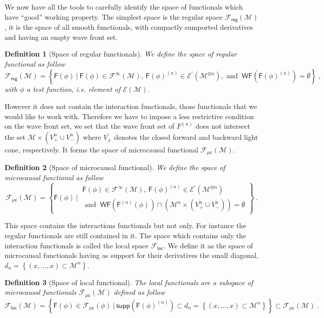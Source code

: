 \documentclass[10pt]{book}
\newcommand{\supp}{\mathsf{supp}}
\newcommand{\WF}{\mathsf{WF}}
\newcommand{\Ecal}{\mathcal{E}}
\newcommand{\Fcal}{\mathcal{F}}
\newcommand{\Mcal}{\mathcal{M}}
\newcommand{\Fsf}{\mathsf{F}}
\newcommand{\csf}{\mathsf{c}}
\theoremstyle{break}
\newtheorem{definition}{Definition}
\begin{document}
We now have all the tools to carefully identify the space of functionals which have ``good'' working property. %
The simplest space is the regular space $\mathcal{F}_\mathsf{reg}(\Mcal)$, it is the space of all smooth functionals, with compactly sumported derivatives and having an empty wave front set. %
%
\begin{definition}[Space of regular functionals]
We define the space of regular functional as follow
%
\begin{equation*}
\Fcal_{\mathsf{reg}}(\Mcal) = \left\{ \Fsf(\phi) \ \bigg| \ \Fsf(\phi) \in \Fcal^\infty(\Mcal), \ \Fsf(\phi)^{(n)} \in \Ecal^\prime(\Mcal^{\otimes n}), \mbox{ and } \ \WF(\Fsf(\phi)^{(n)}) = \emptyset \right\} \ ,
\end{equation*}
%
with $\phi$ a test function, i.e. element of $\Ecal(\Mcal)$. 
\end{definition}
%
However it does not contain the interaction functionals, those functionals that we would like to work with. Therefore we have to impose a less restrictive condition on the wave front set, we set that the wave front set of $F^{(n)}$ does not intersect the set $\mathcal{M} \times (\overline{V^n_+} \cup \overline{V^n_-})$ where $\overline{V_\pm}$ denotes the closed forward and backward light cone, respectively. It forms the space of microcausal functional $\mathcal{F}_\mathsf{\mu c}(\Mcal)$.%
%
\begin{definition}[Space of microcausal functional]
We define the space of microcausal functional as follow
%
\begin{equation*}
\Fcal_{\mu\csf}(\Mcal) = \left\{ 
\Fsf(\phi) \ \bigg| \ 
\begin{array}{l}
\Fsf(\phi) \in \Fcal^\infty(\Mcal), \ \Fsf(\phi)^{(n)} \in \Ecal^\prime(\Mcal^{\otimes n}) \\
\mbox{ and } \ \WF(\Fsf^{(n)}(\phi)) \cap \left( \Mcal^n \times ( \overline{V^{n}_{+}} \cup \overline{V^{n}_{-}} ) \right)  = \emptyset 
\end{array}
\right\} \ .
\end{equation*}
%
\end{definition}
%
This space contains the interactions functionals but not only. For instance the regular functionals are still contained in it. The space which contains only the interaction functionals is called the local space $\mathcal{F}_\mathsf{loc}$. We define it as the space of microcausal functionals having as support for their derivatives the small diagonal, $d_n = \left\{ (x,\dots,x) \subset \Mcal^n \right\}$.%
%
\begin{definition}[Space of local functional]
The local functionals are a subspace of microcausal functionals $\Fcal_{\mathsf{\mu c}}(\Mcal)$ defined as follow
%
\begin{equation*}
\Fcal_{\mathsf{loc}}(\Mcal) = \left\{ \Fsf(\phi) \in \Fcal_{\mu\csf}(\phi) \ \bigg| \ \supp\left(\Fsf(\phi)^{(n)}\right) \subset d_n = \left\{ (x,\dots,x) \subset \Mcal^n \right\} \right\} \subset \Fcal_{\mu\csf}(\Mcal) \ .
\end{equation*}
%
\end{definition}
\end{document}
